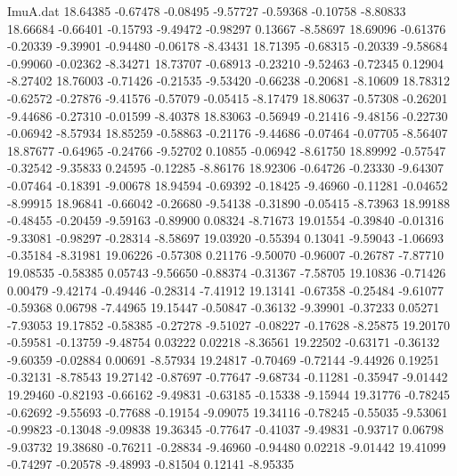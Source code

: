 \begin{filecontents}{ImuA.dat}
  18.64385   -0.67478   -0.08495   -9.57727   -0.59368   -0.10758   -8.80833
  18.66684   -0.66401   -0.15793   -9.49472   -0.98297    0.13667   -8.58697
  18.69096   -0.61376   -0.20339   -9.39901   -0.94480   -0.06178   -8.43431
  18.71395   -0.68315   -0.20339   -9.58684   -0.99060   -0.02362   -8.34271
  18.73707   -0.68913   -0.23210   -9.52463   -0.72345    0.12904   -8.27402
  18.76003   -0.71426   -0.21535   -9.53420   -0.66238   -0.20681   -8.10609
  18.78312   -0.62572   -0.27876   -9.41576   -0.57079   -0.05415   -8.17479
  18.80637   -0.57308   -0.26201   -9.44686   -0.27310   -0.01599   -8.40378
  18.83063   -0.56949   -0.21416   -9.48156   -0.22730   -0.06942   -8.57934
  18.85259   -0.58863   -0.21176   -9.44686   -0.07464   -0.07705   -8.56407
  18.87677   -0.64965   -0.24766   -9.52702    0.10855   -0.06942   -8.61750
  18.89992   -0.57547   -0.32542   -9.35833    0.24595   -0.12285   -8.86176
  18.92306   -0.64726   -0.23330   -9.64307   -0.07464   -0.18391   -9.00678
  18.94594   -0.69392   -0.18425   -9.46960   -0.11281   -0.04652   -8.99915
  18.96841   -0.66042   -0.26680   -9.54138   -0.31890   -0.05415   -8.73963
  18.99188   -0.48455   -0.20459   -9.59163   -0.89900    0.08324   -8.71673
  19.01554   -0.39840   -0.01316   -9.33081   -0.98297   -0.28314   -8.58697
  19.03920   -0.55394    0.13041   -9.59043   -1.06693   -0.35184   -8.31981
  19.06226   -0.57308    0.21176   -9.50070   -0.96007   -0.26787   -7.87710
  19.08535   -0.58385    0.05743   -9.56650   -0.88374   -0.31367   -7.58705
  19.10836   -0.71426    0.00479   -9.42174   -0.49446   -0.28314   -7.41912
  19.13141   -0.67358   -0.25484   -9.61077   -0.59368    0.06798   -7.44965
  19.15447   -0.50847   -0.36132   -9.39901   -0.37233    0.05271   -7.93053
  19.17852   -0.58385   -0.27278   -9.51027   -0.08227   -0.17628   -8.25875
  19.20170   -0.59581   -0.13759   -9.48754    0.03222    0.02218   -8.36561
  19.22502   -0.63171   -0.36132   -9.60359   -0.02884    0.00691   -8.57934
  19.24817   -0.70469   -0.72144   -9.44926    0.19251   -0.32131   -8.78543
  19.27142   -0.87697   -0.77647   -9.68734   -0.11281   -0.35947   -9.01442
  19.29460   -0.82193   -0.66162   -9.49831   -0.63185   -0.15338   -9.15944
  19.31776   -0.78245   -0.62692   -9.55693   -0.77688   -0.19154   -9.09075
  19.34116   -0.78245   -0.55035   -9.53061   -0.99823   -0.13048   -9.09838
  19.36345   -0.77647   -0.41037   -9.49831   -0.93717    0.06798   -9.03732
  19.38680   -0.76211   -0.28834   -9.46960   -0.94480    0.02218   -9.01442
  19.41099   -0.74297   -0.20578   -9.48993   -0.81504    0.12141   -8.95335

\end{filecontents}
